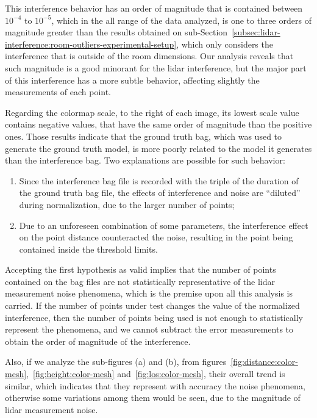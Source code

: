 This interference behavior has an order of magnitude that is contained between $10^{-4}$ to $10^{-5}$, which in the all range of the data analyzed, is one to three orders of magnitude greater than the results obtained on sub-Section~\ref{subsec:lidar-interference:room-outliers-experimental-setup}, which only considers the interference that is outside of the room dimensions. Our analysis reveals that such magnitude is a good minorant for the \ac{lidar} interference, but the major part of this interference has a more subtle behavior, affecting slightly the measurements of each point.

Regarding the colormap scale, to the right of each image, its lowest scale value contains negative values, that have the same order of magnitude than the positive ones. Those results indicate that the ground truth bag, which was used to generate the ground truth model, is more poorly related to the model it generates than the interference bag. Two explanations are possible for such behavior:

\begin{enumerate}
	\item Since the interference bag file is recorded with the triple of the duration of the ground truth bag file, the effects of interference and noise are ``diluted'' during normalization, due to the larger number of points;
	\item Due to an unforeseen  combination of some parameters, the interference effect on the point distance counteracted the noise, resulting in the point being contained inside the threshold limits.
\end{enumerate}

Accepting the first hypothesis as valid implies that the number of points contained on the bag files are not statistically representative of the \ac{lidar} measurement noise phenomena, which is the premise upon all this analysis is carried. If the number of points under test changes the value of the normalized interference, then the number of points being used is not enough to statistically represent the phenomena, and we cannot subtract the error measurements to obtain the order of magnitude of the interference.

Also, if we analyze the sub-figures (a) and (b), from figures~\ref{fig:distance:color-mesh},~\ref{fig:height:color-mesh} and~\ref{fig:los:color-mesh}, their overall trend is similar, which indicates that they represent with accuracy the noise phenomena, otherwise some variations among them would be seen, due to the magnitude of \ac{lidar} measurement noise.

